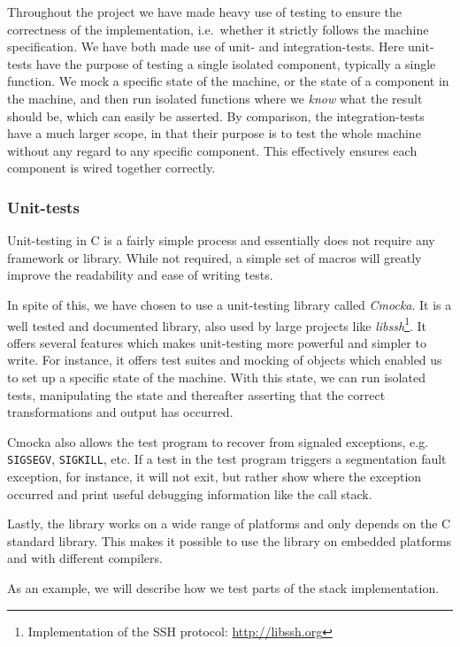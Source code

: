 Throughout the project we have made heavy use of testing to ensure the
correctness of the implementation, i.e.~whether it strictly follows the machine
specification. We have both made use of unit- and integration-tests. Here
unit-tests have the purpose of testing a single isolated component, typically a
single function. We mock a specific state of the machine, or the state of a
component in the machine, and then run isolated functions where we {\it know}
what the result should be, which can easily be asserted. By comparison, the
integration-tests have a much larger scope, in that their purpose is to test the
whole machine without any regard to any specific component. This effectively
ensures each component is wired together correctly.

\subsubsection{Unit-tests}

Unit-testing in C is a fairly simple process and essentially does not require
any framework or library. While not required, a simple set of macros will
greatly improve the readability and ease of writing tests.

In spite of this, we have chosen to use a unit-testing library called {\it
  Cmocka}\cite{cmocka}. It is a well tested and documented library, also used by
large projects like {\it libssh}\footnote{Implementation of the SSH protocol:
  \url{http://libssh.org}}. It offers several features which makes unit-testing
more powerful and simpler to write. For instance, it offers test suites and
mocking of objects which enabled us to set up a specific state of the
machine. With this state, we can run isolated tests, manipulating the state and
thereafter asserting that the correct transformations and output has occurred.

Cmocka also allows the test program to recover from signaled exceptions,
e.g. {\tt SIGSEGV}, {\tt SIGKILL}, etc. If a test in the test program triggers a
segmentation fault exception, for instance, it will not exit, but rather show
where the exception occurred and print useful debugging information like the
call stack.

Lastly, the library works on a wide range of platforms and only depends on the C
standard library. This makes it possible to use the library on embedded
platforms and with different compilers.

As an example, we will describe how we test parts of the stack implementation.

